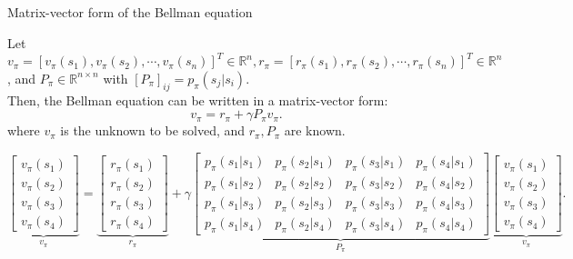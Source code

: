\documentclass[aspectratio=169,xcolor=dvipsnames]{beamer}
\begin{document}
\begin{frame}{Matrix-vector form of the Bellman equation}

Let $v_\pi = [v_\pi(s_1), v_\pi(s_2), \cdots, v_\pi(s_n)]^T \in \mathbb{R}^n, r_\pi = [r_\pi(s_1), r_\pi(s_2), \cdots, r_\pi(s_n)]^T \in \mathbb{R}^n$, and $P_\pi \in \mathbb{R}^{n \times n}$ with $[P_\pi]_{ij} = p_\pi(s_j|s_i)$. \\
Then, the Bellman equation can be written in a matrix-vector form:
\begin{equation} \label{eq:bellman_matrix_vector}
	v_\pi = r_\pi + \gamma P_\pi v_\pi.
\end{equation}
where $v_\pi$ is the unknown to be solved, and $r_\pi, P_\pi$ are known.

\begin{equation*}
	\underbrace{
	\begin{bmatrix}
	v_{\pi}(s_1) \\
	v_{\pi}(s_2) \\
	v_{\pi}(s_3) \\
	v_{\pi}(s_4)
	\end{bmatrix}
	}_{v_{\pi}}
	=
	\underbrace{
	\begin{bmatrix}
	r_{\pi}(s_1) \\
	r_{\pi}(s_2) \\
	r_{\pi}(s_3) \\
	r_{\pi}(s_4)
	\end{bmatrix}
	}_{r_{\pi}}
	+
	\gamma
	\underbrace{
	\begin{bmatrix}
	p_{\pi}(s_1|s_1) & p_{\pi}(s_2|s_1) & p_{\pi}(s_3|s_1) & p_{\pi}(s_4|s_1) \\
	p_{\pi}(s_1|s_2) & p_{\pi}(s_2|s_2) & p_{\pi}(s_3|s_2) & p_{\pi}(s_4|s_2) \\
	p_{\pi}(s_1|s_3) & p_{\pi}(s_2|s_3) & p_{\pi}(s_3|s_3) & p_{\pi}(s_4|s_3) \\
	p_{\pi}(s_1|s_4) & p_{\pi}(s_2|s_4) & p_{\pi}(s_3|s_4) & p_{\pi}(s_4|s_4)
	\end{bmatrix}
	}_{P_{\pi}}
	\underbrace{
	\begin{bmatrix}
	v_{\pi}(s_1) \\
	v_{\pi}(s_2) \\
	v_{\pi}(s_3) \\
	v_{\pi}(s_4)
	\end{bmatrix}
	}_{v_{\pi}}.
\end{equation*}

\end{frame}

\end{document}
